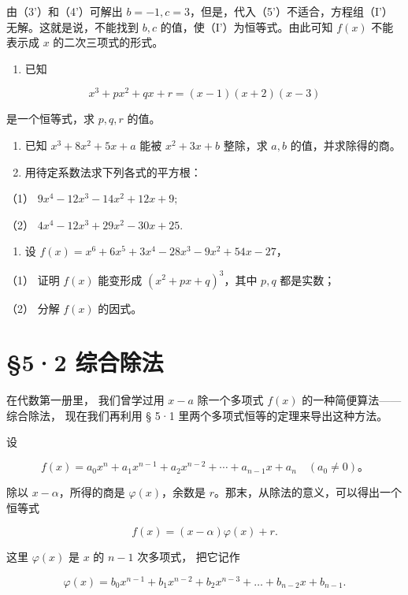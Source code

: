 由（3'）和（4'）可解出
\(b = -1, c = 3\)，但是，代入（5'）不适合，方程组（I'）无解。这就是说，不能找到
\(b, c\) 的值，使（I'）为恒等式。由此可知 \(f(x)\) 不能表示成 \(x\)
的二次三项式的形式。

\begin{enumerate}
\item
  已知
\end{enumerate}

\[
x ^ {3} + p x ^ {2} + q x + r = (x - 1) (x + 2) (x - 3)
\]

是一个恒等式，求 \(p, q, r\) 的值。

\begin{enumerate}[start=2]
\item
  已知 \(x^{3} + 8x^{2} + 5x + a\) 能被 \(x^{2} + 3x + b\) 整除，求
  \(a, b\) 的值，并求除得的商。
\item
  用待定系数法求下列各式的平方根：
\end{enumerate}

（1） \(9x^{4} - 12x^{3} - 14x^{2} + 12x + 9;\)

（2） \(4x^{4} - 12x^{3} + 29x^{2} - 30x + 25.\)

\begin{enumerate}[start=4]
\item
  设 \(f(x) = x^6 + 6x^5 + 3x^4 - 28x^3 - 9x^2 + 54x - 27\)，
\end{enumerate}

（1） 证明 \(f(x)\) 能变形成 \((x^2 + px + q)^3\)，其中 \(p, q\)
都是实数；

（2） 分解 \(f(x)\) 的因式。

\section{§5·2 综合除法}

在代数第一册里， 我们曾学过用 \(x - a\) 除一个多项式 \(f(x)\)
的一种简便算法------综合除法， 现在我们再利用 § 5·1
里两个多项式恒等的定理来导出这种方法。

设

\[
f(x)=a_0x^n+a_1x^{n-1}+a_2x^{n-2}+\cdots+a_{n-1}x+a_n\quad(a_0\ne0)\text{。}
\]

除以 \(x - \alpha\)，所得的商是 \(\varphi(x)\)，余数是
\(r\)。那末，从除法的意义，可以得出一个恒等式

\[
f (x) = (x - \alpha) \varphi (x) + r. \tag {1}
\]

这里 \(\varphi(x)\) 是 \(x\) 的 \(n - 1\) 次多项式， 把它记作

\[
\varphi (x) = b _ {0} x ^ {n - 1} + b _ {1} x ^ {n - 2} + b _ {2} x ^ {n - 3} + \dots + b _ {n - 2} x + b _ {n - 1}.
\]

